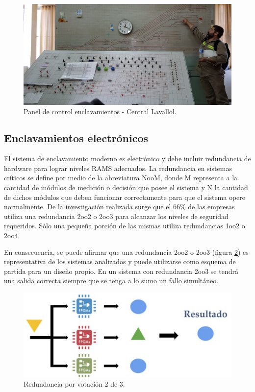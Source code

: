 			\begin{figure}[h!]
				\centering
				\includegraphics[scale=.27]{./Figures/Electromecanico}
				\caption{Panel de control enclavamientos - Central Lavallol.}
				\label{fig:Electromecanico}
			\end{figure}
			
		\subsection{Enclavamientos electrónicos}
		\label{sec:Redundancia}	
			
			El sistema de enclavamiento moderno es electrónico y debe incluir redundancia de hardware para lograr niveles RAMS adecuados. La redundancia en sistemas críticos se define por medio de la abreviatura NooM, donde M representa a la cantidad de módulos de medición o decisión que posee el sistema y N la cantidad de dichos módulos que deben funcionar correctamente para que el sistema opere normalmente\cite{cite17}. De la investigación realizada surge que el $66$\% de las empresas utiliza una redundancia 2oo2 o 2oo3 para alcanzar los niveles de seguridad requeridos\cite{Trenes,cite5,cite6,cite9,cite10,cite12,cite13,cite14,cite15}. Sólo una pequeña porción de las mismas utiliza redundancias 1oo2\cite{cite7} o 2oo4\cite{cite8}. 
			
			En consecuencia, se puede afirmar que una redundancia 2oo2 o 2oo3 (figura \ref{fig:Redundancia}) es representativa de los sistemas analizados y puede utilizarse como esquema de partida para un diseño propio. En un sistema con redundancia 2oo3 se tendrá una salida correcta siempre que se tenga a lo sumo un fallo simultáneo\citep{REDUNDANCIA}. 
			
			\begin{figure}[h]
				\centering
				\includegraphics[scale=.45]{./Figures/Redundancia}
				\caption{Redundancia por votación 2 de 3.}
				\label{fig:Redundancia}
			\end{figure}
			
